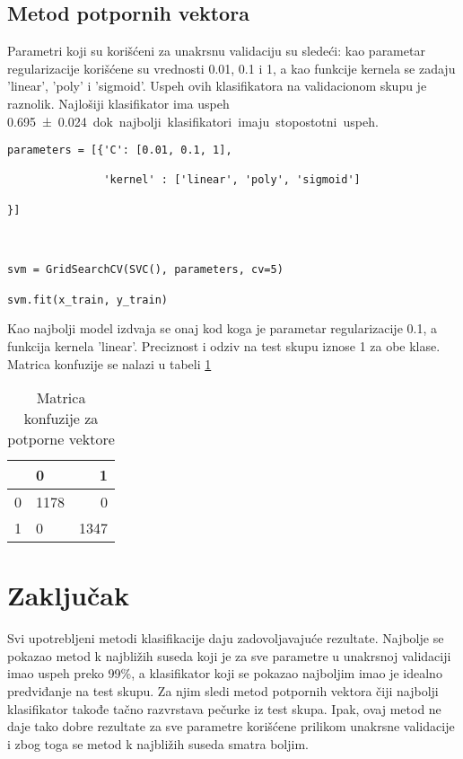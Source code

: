 \documentclass[a4paper]{article}
\begin{document}
\subsection{Metod potpornih vektora}
Parametri koji su korišćeni za unakrsnu validaciju su sledeći: kao parametar regularizacije korišćene su vrednosti 0.01, 0.1 i 1, a  kao funkcije kernela se zadaju 'linear', 'poly' i 'sigmoid'. Uspeh ovih klasifikatora na validacionom skupu je raznolik. Najlošiji klasifikator ima uspeh \SI{0.695 \pm 0.024} dok najbolji klasifikatori imaju stopostotni uspeh.

\begin{lstlisting}[caption={Unakrsna validacija kod metoda potpornih vektora},frame=single, label=simple]
parameters = [{'C': [0.01, 0.1, 1],

               'kernel' : ['linear', 'poly', 'sigmoid']

}]



svm = GridSearchCV(SVC(), parameters, cv=5)

svm.fit(x_train, y_train)
\end{lstlisting}

Kao najbolji model izdvaja se onaj kod koga je parametar regularizacije 0.1, a funkcija kernela 'linear'. Preciznost i odziv na test skupu iznose 1 za obe klase. Matrica konfuzije se nalazi u tabeli \ref{tab:matKonfSVC}

\begin{table}[h]
\begin{center}
\caption{Matrica konfuzije za potporne vektore}
\begin{tabular}{|c|l|r|} \hline
& 0& 1\\ \hline
0 &1178&0\\ \hline
1 &0&1347\\ \hline
\end{tabular}
\label{tab:matKonfSVC}
\end{center}
\end{table}

\section{Zaključak}
\label{sec:zakljucak}
Svi upotrebljeni metodi klasifikacije daju zadovoljavajuće rezultate. Najbolje se pokazao metod k najbližih suseda koji je za sve parametre u unakrsnoj validaciji imao uspeh preko 99\%, a klasifikator koji se pokazao najboljim imao je idealno predviđanje na test skupu. Za njim sledi metod potpornih vektora čiji najbolji klasifikator takođe tačno razvrstava pečurke iz test skupa. Ipak, ovaj metod ne daje tako dobre rezultate za sve parametre korišćene prilikom unakrsne validacije i zbog toga se metod k najbližih suseda smatra boljim.
\end{document}
